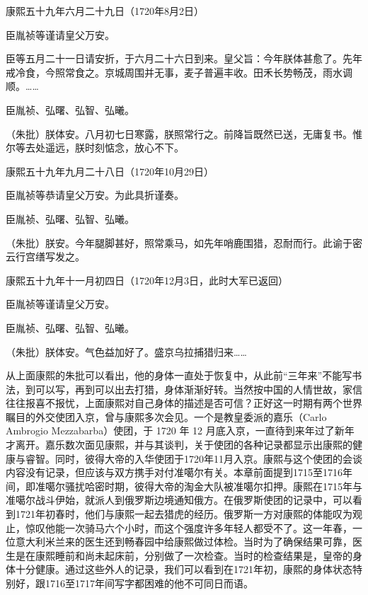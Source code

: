 \begin{bookquote}
康熙五十九年六月二十九日（1720年8月2日）

臣胤祯等谨请皇父万安。

臣等五月二十一日请安折，于六月二十六日到来。皇父旨：今年朕体甚愈了。先年戒冷食，今照常食之。京城周围并无事，麦子普遍丰收。田禾长势畅茂，雨水调顺。……

臣胤祯、弘曙、弘智、弘曦。

（朱批）朕体安。八月初七日寒露，朕照常行之。前降旨既然已送，无庸复书。惟尔等去处遥远，朕时刻惦念，放心不下。
\end{bookquote}

\begin{bookquote}
康熙五十九年九月二十八日（1720年10月29日）

臣胤祯等恭请皇父万安。为此具折谨奏。

臣胤祯、弘曙、弘智、弘曦。

（朱批）朕安。今年腿脚甚好，照常乘马，如先年哨鹿围猎，忍耐而行。此谕于密云行宫缮写发之。
\end{bookquote}

\begin{bookquote}
康熙五十九年十一月初四日（1720年12月3日，此时大军已返回）

臣胤祯等谨请皇父万安。

臣胤祯、弘曙、弘智、弘曦。

（朱批）朕体安。气色益加好了。盛京乌拉捕猎归来……
\end{bookquote}


从上面康熙的朱批可以看出，他的身体一直处于恢复中，从此前“三年来”不能写书法，到可以写，再到可以出去打猎，身体渐渐好转。当然按中国的人情世故，家信往往报喜不报忧，上面康熙对自己身体的描述是否可信？正好这一时期有两个世界瞩目的外交使团入京，曾与康熙多次会见。一个是教皇委派的嘉乐（Carlo Ambrogio Mezzabarba）使团，于 1720 年 12 月底入京，一直待到来年过了新年才离开。嘉乐数次面见康熙，并与其谈判，关于使团的各种记录都显示出康熙的健康与睿智。同时，彼得大帝的入华使团于1720年11月入京。康熙与这个使团的会谈内容没有记录，但应该与双方携手对付准噶尔有关。本章前面提到1715至1716年间，即准噶尔骚扰哈密时期，彼得大帝的淘金大队被准噶尔扣押。康熙在1715年与准噶尔战斗伊始，就派人到俄罗斯边境通知俄方。在俄罗斯使团的记录中，可以看到1721年初春时，他们与康熙一起去猎虎的经历。俄罗斯一方对康熙的体能叹为观止，惊叹他能一次骑马六个小时，而这个强度许多年轻人都受不了。这一年春，一位意大利米兰来的医生还到畅春园中给康熙做过体检。当时为了确保结果可靠，医生是在康熙睡前和尚未起床前，分别做了一次检查。当时的检查结果是，皇帝的身体十分健康。通过这些外人的记录，我们可以看到在1721年初，康熙的身体状态特别好，跟1716至1717年间写字都困难的他不可同日而语。


